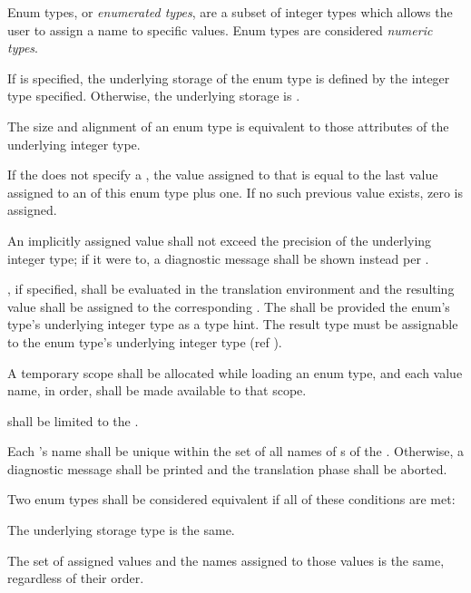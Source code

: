 \specsubsubitem
Enum types, or \textit{enumerated types}, are a subset of integer types which
allows the user to assign a name to specific values. Enum types are considered
\textit{numeric types}.

\specsubsubitem
If  is specified, the underlying storage of the enum
type is defined by the integer type specified. Otherwise, the underlying storage
is .

\specsubsubitem
The size and alignment of an enum type is equivalent to those attributes of the
underlying integer type.

\specsubsubitem
If the  does not specify a ,
the value assigned to that  is equal to the last value
assigned to an  of this enum type plus one. If no such
previous value exists, zero is assigned.

\specsubsubitem
An implicitly assigned value shall not exceed the precision of the underlying
integer type; if it were to, a diagnostic message shall be shown instead per
.

\specsubsubitem
{}, if specified, shall be evaluated in the translation
environment and the resulting value shall be assigned to the corresponding
. The  shall be provided the
enum's type's underlying integer type as a type hint. The result type must be
assignable to the enum type's underlying integer type (ref
).

\specsubsubitem
A temporary scope shall be allocated while loading an enum type, and each value
name, in order, shall be made available to that scope.


\specsubsubitem
{} shall be limited to the
.

\specsubsubitem
Each 's name shall be unique within the set of all
names of s of the . Otherwise, a
diagnostic message shall be printed and the translation phase shall be aborted.

\specsubsubitem
Two enum types shall be considered equivalent if all of these conditions are
met:

\begin{subsubitemize}
\item
The underlying storage type is the same.
\item
The set of assigned values and the names assigned to those values is the same,
regardless of their order.
\end{subsubitemize}

